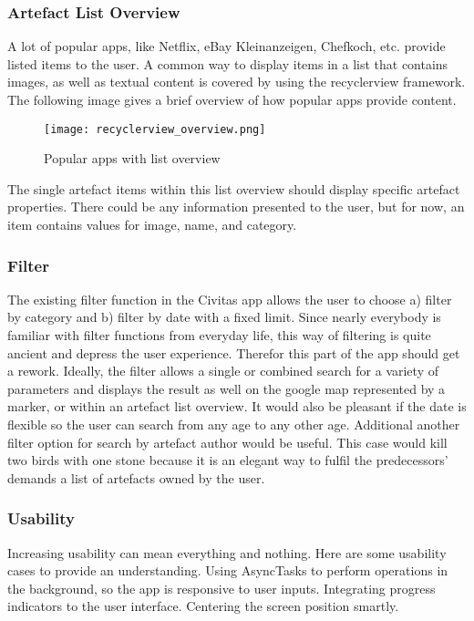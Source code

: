 \subsubsection{Artefact List Overview}

A lot of popular apps, like Netflix, eBay Kleinanzeigen, Chefkoch, etc. provide listed items to the user. A common way to display items in a list that contains images, as well as textual content is covered by using the recyclerview framework. The following image gives a brief overview of how popular apps provide content.

\begin{figure}[H]
	\centering \texttt{[image: recyclerview\_overview.png]}
	\caption[Popular apps with list overview]{Popular apps with list overview}
	\label{fig:recyclerview_overview}
\end{figure}

The single artefact items within this list overview should display specific artefact properties. There could be any information presented to the user, but for now, an item contains values for image, name, and category. 



\subsubsection{Filter}
The existing filter function in the Civitas app allows the user to choose a) filter by category and b) filter by date with a fixed limit.
Since nearly everybody is familiar with filter functions from everyday life, this way of filtering is quite ancient and depress the user experience. Therefor this part of the app should get a rework.
Ideally, the filter allows a single or combined search for a variety of parameters and displays the result as well on the google map represented by a marker, or within an artefact list overview. It would also be pleasant if the date is flexible so the user can search from any age to any other age. Additional another filter option for search by artefact author would be useful. This case would kill two birds with one stone because it is an elegant way to fulfil the predecessors' demands a list of artefacts owned by the user.

\subsubsection{Usability}
Increasing usability can mean everything and nothing. Here are some usability cases to provide an understanding. Using AsyncTasks to perform operations in the background, so the app is responsive to user inputs. Integrating progress indicators to the user interface. Centering the screen position smartly.



